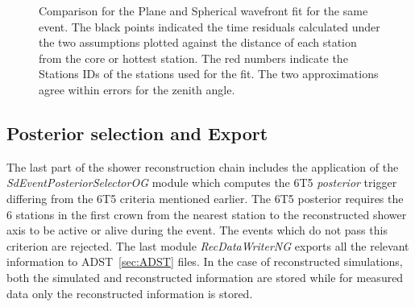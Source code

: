 \begin{figure}[h!]
  \centering
  \hfill
  
\caption{Comparison for the Plane and Spherical wavefront fit for the same event. The black points indicated the time residuals calculated under the two assumptions plotted against the distance of each station from the core or hottest station. The red numbers indicate the Stations IDs of the stations used for the fit. The two approximations agree within errors for the zenith angle.}
  \label{fig:Wavefront_comp}
\end{figure}

\subsection{Posterior selection and Export}
\label{subsec:reco_possel}

The last part of the shower reconstruction chain includes the application of the \textit{SdEventPosteriorSelectorOG} module which computes the 6T5 \textit{posterior} trigger differing from the 6T5 criteria mentioned earlier. The 6T5 posterior requires the 6 stations in the first crown from the nearest station to the reconstructed shower axis to be active or alive during the event. The events which do not pass this criterion are rejected. The last module \textit{RecDataWriterNG} exports all the relevant information to ADST~\ref{sec:ADST} files. In the case of reconstructed simulations, both the simulated and reconstructed information are stored while for measured data only the reconstructed information is stored.

